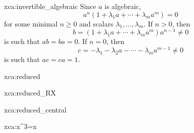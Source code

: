 \begin{sol}{xca:invertible_algebraic}
	Since $a$ is algebraic, 
	\[
		a^n(1+\lambda_1a+\cdots+\lambda_ma^m)=0
	\]
	for some minimal $n\geq0$ and scalars $\lambda_1,\dots,\lambda_m$. If  
	$n>0$, then 
	\[
	b=(1+\lambda_1a+\cdots+\lambda_ma^m)a^{n-1}\ne 0
	\]
	is such that $ab=ba=0$. If $n=0$, then  
	\[
		c=-\lambda_1-\lambda_2a-\cdots-\lambda_ma^{m-1}\ne 0
	\]
	is such that $ac=ca=1$. 
\end{sol}

\begin{sol}{xca:reduced}

\end{sol}

\begin{sol}{xca:reduced_RX}

\end{sol}

\begin{sol}{xca:reduced_central}
\end{sol}

\begin{sol}{xca:x^3=x}
\end{sol}

